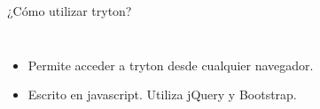 \begin{frame}[fragile=singleslide]{¿Cómo utilizar tryton?}
\begin{columns}
            \fontsize{10}{8}\selectfont
            \begin{itemize}
                \item Permite acceder a tryton desde cualquier navegador.
                \item Escrito en javascript. Utiliza jQuery y Bootstrap.
            \end{itemize}
        \end{columns}
	\end{frame}

%
%
